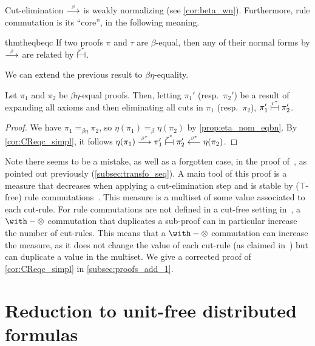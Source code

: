 \documentclass{lmcs}
\newcommand*{\tens}{\otimes} %
\newcommand*{\resp}{resp.}
\newcommand*{\eqeq}{=} %
\newcommand{\symboltext}[2]{\mathrel{\overset{\makebox[0pt]{\mbox{\normalfont\tiny\sffamily \ensuremath{#1}}}}{#2}}} %
\newcommand{\betato}{\symboltext{\beta}{\longrightarrow}}
\newcommand{\betatostar}{\symboltext{\beta^*}{\longrightarrow}}
\newcommand{\betafromstar}{\symboltext{\beta^*}{\longleftarrow}}
\newcommand{\vdashv}{\mathrel{\lower .22ex \hbox{$\vdash\!\dashv$}}}
\DeclareRobustCommand{\astsymbol}[1]{\mathrel{\ooalign{{$\vdashv$}\crcr{$\stackrel{#1}{\hphantom{\vdashv}\vphantom{\to}}$}}}}
\newcommand{\eqc}{\astsymbol{r^\ast}} %
\newcommand{\eqb}{\mathrel{\eqeq_{\beta}}}
\newcommand{\eqbn}{\mathrel{\eqeq_{\beta\eta}}}
\begin{document}
Cut-elimination $\betato$ is weakly normalizing (see \autoref{cor:beta_wn}).
Furthermore, rule commutation is its ``core'', in the following meaning.

\begin{restatable}{thm}{theqbeqc}
\label{cor:CReqc_simpl}
If two proofs $\pi$ and $\tau$ are $\beta$-equal, then any of their normal forms by $\betato$ are related by $\eqc$.
\end{restatable}

We can extend the previous result to $\beta\eta$-equality.

\begin{thm}
\label{th:eqbn_eqc}
Let $\pi_1$ and $\pi_2$ be $\beta\eta$-equal proofs.
Then, letting $\pi_1'$ (\resp\ $\pi_2'$) be a result of expanding all axioms and then eliminating all cuts in $\pi_1$ (\resp\ $\pi_2$), $\pi_1' \eqc \pi_2'$.
\end{thm}
\begin{proof}
We have $\pi_1\eqbn\pi_2$, so $\eta(\pi_1)\eqb\eta(\pi_2)$ by \autoref{prop:eta_nom_eqbn}.
By \autoref{cor:CReqc_simpl}, it follows $\eta(\pi_1)\betatostar\pi_1'\eqc\pi_2'\betafromstar\eta(\pi_2)$.
\end{proof}

Note there seems to be a mistake, as well as a forgotten case, in the proof of~\cite[Theorem~5.1]{calculusformall}, as pointed out previously (\autoref{subsec:transfo_seq}).
A main tool of this proof is a measure that decreases when applying a cut-elimination step and is stable by ($\top$-free) rule commutations~\cite[Proposition~B.2]{calculusformall}.
This measure is a multiset of some value associated to each cut-rule.
For rule commutations are not defined in a cut-free setting in~\cite{calculusformall}, a $\with-\tens$ commutation that duplicates a sub-proof can in particular increase the number of cut-rules.
This means that a $\with-\tens$ commutation can increase the measure, as it does not change the value of each cut-rule (as claimed in~\cite{calculusformall}) but can duplicate a value in the multiset.
We give a corrected proof of \autoref{cor:CReqc_simpl} in \autoref{subsec:proofs_add_1}.


\section{Reduction to unit-free distributed formulas}
\label{sec:red_unit-free}
\end{document}
